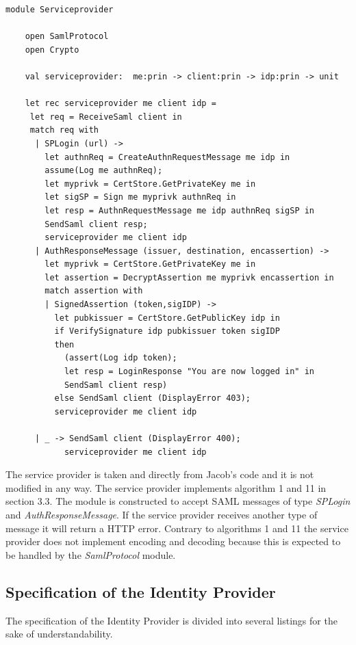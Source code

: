 \documentclass[twosided]{report}
\begin{document}
\begin{lstlisting}[style=fstar, caption={Specification of service provider}]
	module Serviceprovider
	
	open SamlProtocol
	open Crypto
	
	val serviceprovider:  me:prin -> client:prin -> idp:prin -> unit
	
	let rec serviceprovider me client idp = 
	 let req = ReceiveSaml client in
	 match req with
	  | SPLogin (url) ->
	    let authnReq = CreateAuthnRequestMessage me idp in
	    assume(Log me authnReq);
	    let myprivk = CertStore.GetPrivateKey me in
	    let sigSP = Sign me myprivk authnReq in
	    let resp = AuthnRequestMessage me idp authnReq sigSP in 
	    SendSaml client resp;
	    serviceprovider me client idp
	  | AuthResponseMessage (issuer, destination, encassertion) -> 
	    let myprivk = CertStore.GetPrivateKey me in
	    let assertion = DecryptAssertion me myprivk encassertion in
	    match assertion with
	    | SignedAssertion (token,sigIDP) ->
	      let pubkissuer = CertStore.GetPublicKey idp in
	      if VerifySignature idp pubkissuer token sigIDP
	      then
	        (assert(Log idp token);
	        let resp = LoginResponse "You are now logged in" in
	        SendSaml client resp)
	      else SendSaml client (DisplayError 403);
	      serviceprovider me client idp
	  
	  | _ -> SendSaml client (DisplayError 400);
	        serviceprovider me client idp
\end{lstlisting}
The service provider is taken and directly from Jacob's code and it is not modified in any way. The service provider implements algorithm 1 and 11 in section 3.3. The module is constructed to accept SAML messages of type \emph{SPLogin} and \emph{AuthResponseMessage}. If the service provider receives another type of message it will return a HTTP error. Contrary to algorithms 1 and 11 the service provider does not implement encoding and decoding because this is expected to be handled by the \emph{SamlProtocol} module.
\subsection{Specification of the Identity Provider}
The specification of the Identity Provider is divided into several listings for the sake of understandability.
\end{document}
